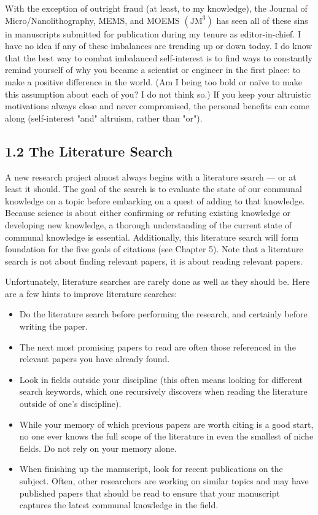 With the exception of outright fraud (at least, to my knowledge), the Journal of Micro/Nanolithography, MEMS, and MOEMS $\left(\mathrm{JM}^{3}\right)$ has seen all of these sins in manuscripts submitted for publication during my tenure as editor-in-chief. I have no idea if any of these imbalances are trending up or down today. I do know that the best way to combat imbalanced self-interest is to find ways to constantly remind yourself of why you became a scientist or engineer in the first place: to make a positive difference in the world. (Am I being too bold or naïve to make this assumption about each of you? I do not think so.) If you keep your altruistic motivations always close and never compromised, the personal benefits can come along (self-interest "and" altruism, rather than "or").

\subsection*{1.2 The Literature Search}
A new research project almost always begins with a literature search — or at least it should. The goal of the search is to evaluate the state of our communal knowledge on a topic before embarking on a quest of adding to that knowledge. Because science is about either confirming or refuting existing knowledge or developing new knowledge, a thorough understanding of the current state of communal knowledge is essential. Additionally, this literature search will form  foundation for the five goals of citations (see Chapter 5). Note that a literature search is not about finding relevant papers, it is about reading relevant papers.

Unfortunately, literature searches are rarely done as well as they should be. Here are a few hints to improve literature searches:

\begin{itemize}
  \item Do the literature search before performing the research, and certainly before writing the paper.
  \item The next most promising papers to read are often those referenced in the relevant papers you have already found.
  \item Look in fields outside your discipline (this often means looking for different search keywords, which one recursively discovers when reading the literature outside of one's discipline).
  \item While your memory of which previous papers are worth citing is a good start, no one ever knows the full scope of the literature in even the smallest of niche fields. Do not rely on your memory alone.
  \item When finishing up the manuscript, look for recent publications on the subject. Often, other researchers are working on similar topics and may have published papers that should be read to ensure that your manuscript captures the latest communal knowledge in the field.
\end{itemize}

